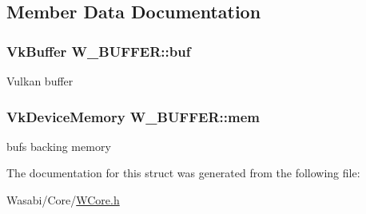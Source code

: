 \subsection{Member Data Documentation}
\subsubsection[{\texorpdfstring{buf}{buf}}]{\setlength{\rightskip}{0pt plus 5cm}Vk\+Buffer W\+\_\+\+B\+U\+F\+F\+E\+R\+::buf}\hypertarget{struct_w___b_u_f_f_e_r_ab54560f99cea81c48d1c386ec1e29a10}{}\label{struct_w___b_u_f_f_e_r_ab54560f99cea81c48d1c386ec1e29a10}
Vulkan buffer 
\subsubsection[{\texorpdfstring{mem}{mem}}]{\setlength{\rightskip}{0pt plus 5cm}Vk\+Device\+Memory W\+\_\+\+B\+U\+F\+F\+E\+R\+::mem}\hypertarget{struct_w___b_u_f_f_e_r_af34fc1a3e7fb5994021ffbe323f77b8f}{}\label{struct_w___b_u_f_f_e_r_af34fc1a3e7fb5994021ffbe323f77b8f}
buf\textquotesingle{}s backing memory 

The documentation for this struct was generated from the following file\+:\begin{DoxyCompactItemize}
\item 
Wasabi/\+Core/\hyperlink{_w_core_8h}{W\+Core.\+h}\end{DoxyCompactItemize}
